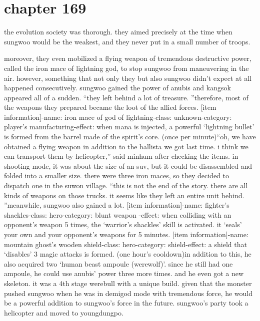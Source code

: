 \section{chapter 169}

                            the evolution society was thorough.
 they aimed precisely at the time when sungwoo would be the weakest, and they never put in a small number of troops.





moreover, they even mobilized a flying weapon of tremendous destructive power, called the iron mace of lightning god, to stop sungwoo from maneuvering in the air.
however, something that not only they but also sungwoo didn’t expect at all happened consecutively.
 sungwoo gained the power of anubis and kangsok appeared all of a sudden.
“they left behind a lot of treasure.
”therefore, most of the weapons they prepared became the loot of the allied forces.
[item information]-name: iron mace of god of lightning-class: unknown-category: player’s manufacturing-effect: when mana is injected, a powerful ‘lightning bullet’ is formed from the barrel made of the spirit’s core.
 (once per minute)“oh, we have obtained a flying weapon in addition to the ballista we got last time.
 i think we can transport them by helicopter,” said minhum after checking the items.
in shooting mode, it was about the size of an suv, but it could be disassembled and folded into a smaller size.
 there were three iron maces, so they decided to dispatch one in the suwon village.
“this is not the end of the story.
 there are all kinds of weapons on those trucks.
 it seems like they left an entire unit behind.
”meanwhile, sungwoo also gained a lot.
[item information]-name: fighter’s shackles-class: hero-category: blunt weapon
-effect: when colliding with an opponent’s weapon 5 times, the ‘warrior’s shackles’ skill is activated.
 it ‘seals’ your own and your opponent’s weapons for 5 minutes.
[item information]-name: mountain ghost’s wooden shield-class: hero-category: shield-effect: a shield that ‘disables’ 3 magic attacks is formed.
 (one hour’s cooldown)in addition to this, he also acquired two ‘human beast ampoule (werewolf)’.
 since he still had one ampoule, he could use anubis’ power three more times.
and he even got a new skeleton.
 it was a 4th stage werebull with a unique build.
 given that the monster pushed sungwoo when he was in demigod mode with tremendous force, he would be a powerful addition to sungwoo’s force in the future.
sungwoo’s party took a helicopter and moved to youngdungpo.
